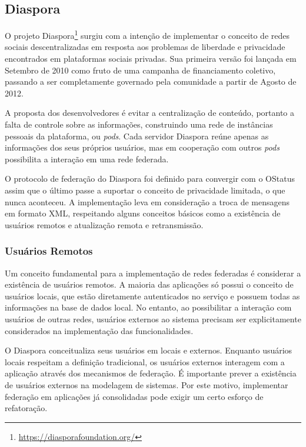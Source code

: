 \subsection{Diaspora}

O projeto Diaspora\footnote{\url{https://diasporafoundation.org/}} surgiu com a
intenção de implementar o conceito de redes sociais descentralizadas em resposta aos
problemas de liberdade e privacidade encontrados em plataformas sociais privadas.
Sua primeira versão foi lançada em Setembro de 2010 como fruto de uma campanha de
financiamento coletivo, passando a ser completamente governado pela comunidade a
partir de Agosto de 2012.

A proposta dos desenvolvedores é evitar a centralização de conteúdo, portanto a
falta de controle sobre as informações, construindo uma rede de instâncias pessoais
da plataforma, ou \textit{pods}. Cada servidor Diaspora reúne apenas as informações
dos seus próprios usuários, mas em cooperação com outros \textit{pods} possibilita a
interação em uma rede federada.

O protocolo de federação do Diaspora foi definido para convergir com o OStatus assim
que o último passe a suportar o conceito de privacidade limitada, o que nunca
aconteceu. A implementação leva em consideração a troca de mensagens em formato XML,
respeitando alguns conceitos básicos como a existência de usuários remotos e
atualização remota e retransmissão.

\subsubsection{Usuários Remotos}

Um conceito fundamental para a implementação de redes federadas é considerar a
existência de usuários remotos. A maioria das aplicações só possui o conceito de
usuários locais, que estão diretamente autenticados no serviço e possuem todas as
informações na base de dados local. No entanto, ao possibilitar a interação com
usuários de outras redes, usuários externos ao sistema precisam ser explicitamente
considerados na implementação das funcionalidades.

O Diaspora conceitualiza seus usuários em locais e externos. Enquanto usuários
locais respeitam a definição tradicional, os usuários externos interagem com a
aplicação através dos mecanismos de federação. É importante prever a existência de
usuários externos na modelagem de sistemas. Por este motivo, implementar federação
em aplicações já consolidadas pode exigir um certo esforço de refatoração.

